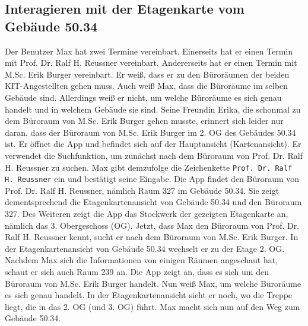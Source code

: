 \subsection{Interagieren mit der Etagenkarte vom Gebäude 50.34}

Der \Gls{Benutzer} Max hat zwei Termine vereinbart.
Einerseits hat er einen Termin mit Prof. Dr. Ralf H. Reussner vereinbart.
Andererseits hat er einen Termin mit M.Sc. Erik Burger vereinbart.
Er weiß, dass er zu den Büroräumen der beiden \Gls{KIT}-Angestellten gehen muss.
Auch weiß Max, dass die Büroräume im selben Gebäude sind.
Allerdings weiß er nicht, um welche Büroräume es sich genau handelt und in welchem Gebäude sie sind.
Seine Freundin Erika, die schonmal zu dem Büroraum von M.Sc. Erik Burger gehen musste, erinnert sich leider nur daran, dass der Büroraum von M.Sc. Erik Burger im 2. OG des Gebäudes 50.34 ist.
Er öffnet die App und befindet sich auf der Hauptansicht (\Gls{Kartenansicht}).
Er verwendet die Suchfunktion, um zunächst nach dem Büroraum von Prof. Dr. Ralf H. Reussner zu suchen.
Max gibt demzufolge die \Gls{Zeichenkette} \texttt{Prof. Dr. Ralf H. Reussner} ein und bestätigt seine Eingabe.
Die App findet den Büroraum von Prof. Dr. Ralf H. Reussner, nämlich Raum 327 im Gebäude 50.34.
Sie zeigt dementsprechend die \Gls{Etagenkartenansicht} von Gebäude 50.34 und den Büroraum 327.
Des Weiteren zeigt die App das Stockwerk der gezeigten \Gls{Etagenkarte} an, nämlich das 3. Obergeschoss (OG).
Jetzt, dass Max den Büroraum von Prof. Dr. Ralf H. Reussner kennt, sucht er nach dem Büroraum von M.Sc. Erik Burger. 
In der \Gls{Etagenkartenansicht} von Gebäude 50.34 wechselt er zu der Etage 2. OG.
Nachdem Max sich die Informationen von einigen Räumen angeschaut hat, schaut er sich auch Raum 239 an. 
Die App zeigt an, dass es sich um den Büroraum von M.Sc. Erik Burger handelt.
Nun weiß Max, um welche Büroräume es sich genau handelt.
In der \Gls{Etagenkartenansicht} sieht er noch, wo die Treppe liegt, die in das 2. OG (und 3. OG) führt.
Max macht sich nun auf den Weg zum Gebäude 50.34.

